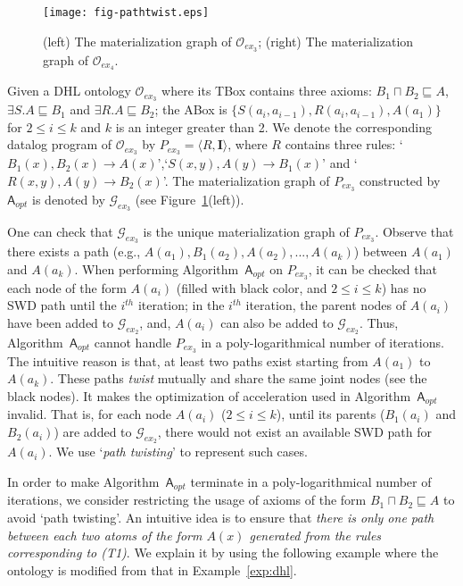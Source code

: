 \documentclass[final,1p,times]{elsarticle}
\begin{document}
\begin{figure}[htbp]
\begin{center}
\texttt{[image: fig-pathtwist.eps]}
\caption{(left) The materialization graph of $\mathcal{O}_{ex_3}$;
(right) The materialization graph of $\mathcal{O}_{ex_4}$.}
\label{fig:ex3_4}
\end{center}
\end{figure}

\begin{example}\label{exp:dhl}
Given a DHL ontology $\mathcal{O}_{ex_3}$ where its TBox contains three axioms:
$B_1\sqcap B_2\sqsubseteq A$, $\exists S.A\sqsubseteq B_1$ and $\exists R.A\sqsubseteq B_2$;
the ABox is $\{S(a_i,a_{i-1}), R(a_i,a_{i-1}), A(a_1)\}$
for $2\leq i\leq k$ and $k$ is an integer greater than 2.
We denote the corresponding datalog program of $\mathcal{O}_{ex_3}$ by $P_{ex_3}=\langle R, \textbf{I}\rangle$,
where $R$ contains three rules: `$B_1(x),B_2(x)\rightarrow A(x)$',`$S(x,y),A(y)\rightarrow B_1(x)$' and `$R(x,y),A(y)\rightarrow B_2(x)$'.
The materialization graph of $P_{ex_3}$ constructed by $\mathsf{A}_{opt}$ is denoted by $\mathcal{G}_{ex_3}$ (see Figure~\ref{fig:ex3_4}(left)).
\end{example}

One can check that $\mathcal{G}_{ex_3}$ is the unique materialization graph of $P_{ex_3}$.
Observe that there exists a path (e.g., $A(a_1),B_1(a_2),A(a_2),...,A(a_k)$) between $A(a_1)$ and $A(a_k)$.
When performing Algorithm~$\mathsf{A}_{opt}$ on $P_{ex_3}$, it can be checked that
each node of the form $A(a_i)$ (filled with black color,
and $2\leq i\leq k$) has no SWD path until the $i^{th}$ iteration;
in the $i^{th}$ iteration, the parent nodes of $A(a_i)$ have been added to $\mathcal{G}_{ex_2}$,
and, $A(a_i)$ can also be added to $\mathcal{G}_{ex_2}$.
Thus, Algorithm~$\mathsf{A}_{opt}$ cannot handle $P_{ex_3}$ in a poly-logarithmical
number of iterations.
The intuitive reason is that, at least two paths exist
starting from $A(a_1)$ to $A(a_k)$. These paths \emph{twist} mutually and share the same joint nodes (see the black nodes).
It makes the optimization of acceleration used in Algorithm~$\mathsf{A}_{opt}$ invalid.
That is, for each node $A(a_i)$ ($2\leq i\leq k$), until its parents ($B_1(a_i)$ and $B_2(a_i)$) are added
to $\mathcal{G}_{ex_2}$, there would not exist an available SWD path for $A(a_i)$.
We use `\emph{path twisting}' to represent such cases.

In order to make Algorithm~$\mathsf{A}_{opt}$ terminate in a poly-logarithmical number of iterations,
we consider restricting the usage of axioms of the form $B_1\sqcap B_2\sqsubseteq A$
to avoid `path twisting'. An intuitive idea is to
ensure that \emph{there is only one path between each two atoms of the form $A(x)$
generated from the rules corresponding to (T1)}.
We explain it by using the following example where the ontology is modified from
that in Example~\ref{exp:dhl}.
\end{document}
